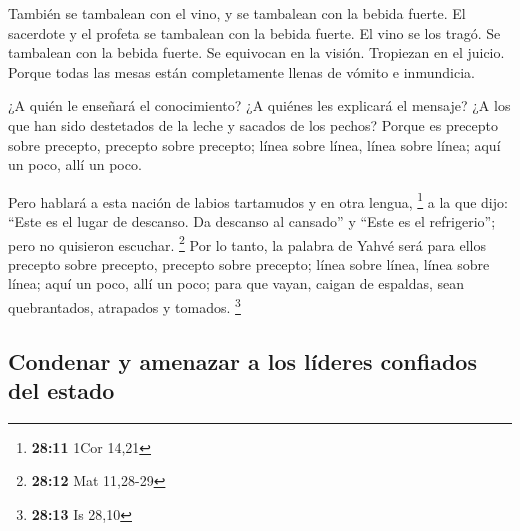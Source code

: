 \begin{paracol}{2}
 También se tambalean con el vino, y se tambalean con la
bebida fuerte. El sacerdote y el profeta se tambalean con la bebida
fuerte. El vino se los tragó. Se tambalean con la bebida fuerte. Se
equivocan en la visión. Tropiezan en el juicio.  Porque
todas las mesas están completamente llenas de vómito e inmundicia.

 ¿A quién le enseñará el conocimiento? ¿A quiénes les
explicará el mensaje? ¿A los que han sido destetados de la leche y
sacados de los pechos?  Porque es precepto sobre
precepto, precepto sobre precepto; línea sobre línea, línea sobre línea;
aquí un poco, allí un poco.

 Pero hablará a esta nación de labios tartamudos y en
otra lengua, \footnote{\textbf{28:11} 1Cor 14,21}  a la
que dijo: ``Este es el lugar de descanso. Da descanso al cansado'' y
``Este es el refrigerio''; pero no quisieron escuchar. \footnote{\textbf{28:12}
  Mat 11,28-29}  Por lo tanto, la palabra de Yahvé será
para ellos precepto sobre precepto, precepto sobre precepto; línea sobre
línea, línea sobre línea; aquí un poco, allí un poco; para que vayan,
caigan de espaldas, sean quebrantados, atrapados y tomados. \footnote{\textbf{28:13}
  Is 28,10}

\hypertarget{condenar-y-amenazar-a-los-luxedderes-confiados-del-estado}{%
\subsection{Condenar y amenazar a los líderes confiados del
estado}\label{condenar-y-amenazar-a-los-luxedderes-confiados-del-estado}}


\end{paracol}
